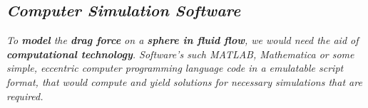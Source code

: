             
            
            
            
            
            
            
            
            
            
            
            
            
            
\subsection{\textit{Computer Simulation Software}}
        
    \textit{To \textbf{model} the \textbf{drag force} on a \textbf{sphere in fluid flow}, we would need the aid of \textbf{computational technology}. Software's such MATLAB, Mathematica or some simple, eccentric computer programming language code in a emulatable script format, that would compute and yield solutions for necessary simulations that are required.}
    
